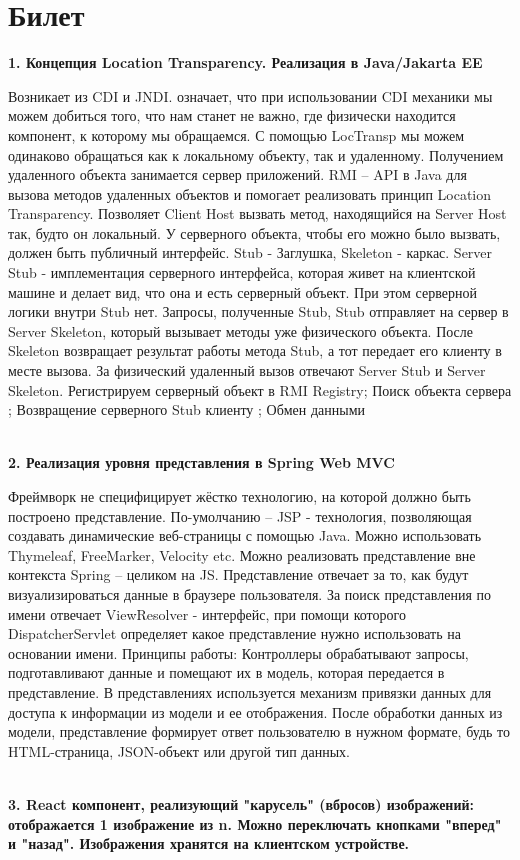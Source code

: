 \documentclass{article}
\newcommand{\bil}[5]{%
        \section{Билет}
        \textbf{1. #1}

        #4
        \\
        \textbf{2. #2}
        
        #5
        \\
        \textbf{3. #3}
}
\begin{document}
\bil{Концепция Location Transparency. Реализация в Java/Jakarta EE}{Реализация уровня представления в Spring Web MVC}{React компонент, реализующий "карусель" (вбросов) изображений: отображается 1 изображение из n. Можно переключать кнопками "вперед" и "назад". Изображения хранятся на клиентском устройстве.}{
    Возникает из CDI и JNDI. означает, что при использовании CDI механики мы можем добиться того, что нам станет не важно, где физически находится компонент, к которому мы обращаемся.
С помощью LocTransp мы можем одинаково обращаться как к локальному объекту, так и удаленному. Получением удаленного объекта занимается сервер приложений.
RMI – API в Java для вызова методов удаленных объектов и помогает реализовать принцип Location Transparency. Позволяет Client Host вызвать метод, находящийся на Server Host так, будто он локальный. У серверного объекта, чтобы его можно было вызвать, должен быть публичный интерфейс.
Stub - Заглушка, Skeleton - каркас. Server Stub - имплементация серверного интерфейса, которая живет на клиентской машине и делает вид, что она и есть серверный объект. При этом серверной логики внутри Stub нет.
Запросы, полученные Stub, Stub отправляет на сервер в Server Skeleton, который вызывает методы уже физического объекта. После Skeleton возвращает результат работы метода Stub, а тот передает его клиенту в месте вызова.
За физический удаленный вызов отвечают Server Stub и Server Skeleton. Регистрируем серверный объект в RMI Registry; Поиск объекта сервера
; Возвращение серверного Stub клиенту
; Обмен данными
}{
    Фреймворк не специфицирует жёстко технологию, на которой должно быть построено представление. По-умолчанию – JSP  -  технология, позволяющая создавать динамические веб-страницы с помощью Java. 
    Можно использовать Thymeleaf, FreeMarker, Velocity etc. 
    Можно реализовать представление вне контекста Spring – целиком на JS. 
    Представление отвечает за то, как будут визуализироваться данные в браузере пользователя. 
    За поиск представления по имени отвечает ViewResolver - интерфейс, при помощи которого DispatcherServlet определяет какое представление нужно использовать на основании имени.
    Принципы работы:
    Контроллеры обрабатывают запросы, подготавливают данные и помещают их в модель, которая передается в представление.
    В представлениях используется механизм привязки данных для доступа к информации из модели и ее отображения.
    После обработки данных из модели, представление формирует ответ пользователю в нужном формате, будь то HTML-страница, JSON-объект или другой тип данных.
}
\end{document}
